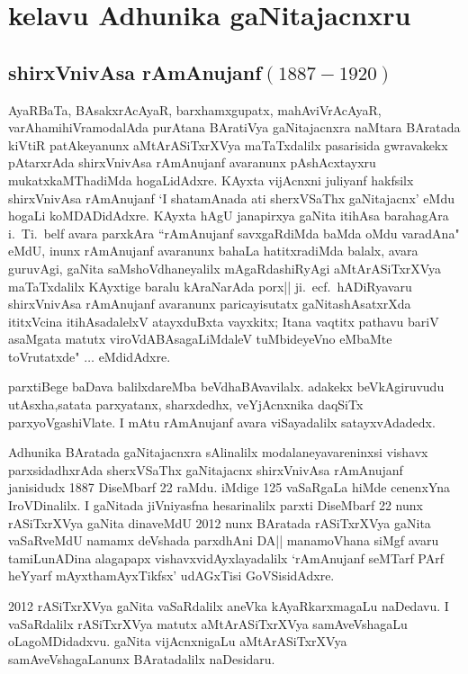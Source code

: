 \chapter{kelavu Adhunika gaNitajacnxru}

\section{{\protect\bf shirxVnivAsa rAmAnujanf$(1887-1920)$}}


AyaRBaTa, BAsakxrAcAyaR, barxhamxgupatx, mahAviVrAcAyaR, varAhamihiVra\break modalAda purAtana BAratiVya gaNitajacnxra naMtara BAratada kiVtiR patAkeyanunx aMtArASiTxrXVya maTaTxdalilx pasarisida gwravakekx pAtarxrAda shirxVnivAsa rAmAnujanf avaranunx pAshAcxtayxru mukatxkaMThadiMda hogaLidAdxre. KAyxta vijAcnxni juliyanf hakfsilx shirxVnivAsa rAmAnujanf `I shatamAnada ati sherxVSaThx gaNitajacnx' eMdu hogaLi koMDADidAdxre. KAyxta hAgU janapirxya gaNita itihAsa barahagAra i.~Ti.~belf avara parxkAra ``rAmAnujanf savxgaRdiMda baMda oMdu varadAna" eMdU, inunx rAmAnujanf avaranunx bahaLa hatitxradiMda balalx, avara guruvAgi, gaNita saMshoVdhaneyalilx mAgaRdashiRyAgi aMtArASiTxrXVya maTaTxdalilx KAyxtige baralu kAraNarAda porx|| ji.~ecf.~hADiRyavaru shirxVnivAsa rAmAnujanf avaranunx paricayisutatx gaNitashAsatxrXda ititxVcina itihAsadalelxV atayxduBxta vayxkitx; Itana vaqtitx pathavu bariV asaMgata matutx viroVdABAsagaLiMdaleV tuMbideyeVno eMbaMte toVrutatxde" $\ldots$ eMdidAdxre.

parxtiBege baDava balilxdareMba beVdhaBAvavilalx. adakekx beVkAgiruvudu utAsxha,\break satata parxyatanx, sharxdedhx, veYjAcnxnika daqSiTx parxyoVgashiVlate. I mAtu rAmAnujanf avara viSayadalilx satayxvAdadedx.

Adhunika BAratada gaNitajacnxra sAlinalilx modalaneyavareninxsi vishavx parxsidadhxrAda sherxVSaThx gaNitajacnx shirxVnivAsa rAmAnujanf janisidudx {\rm 1887} DiseMbarf {\rm 22} raMdu. iMdige {\rm 125} vaSaRgaLa hiMde cenenxYna IroVDinalilx. I gaNitada jiVniyasfna hesarinalilx parxti DiseM\-barf {\rm 22} nunx rASiTxrXVya gaNita dinaveMdU {\rm 2012} nunx BAratada rASiTxrXVya gaNita vaSaRveMdU namamx deVshada parxdhAni DA|| manamoVhana siMgf avaru tamiLunADina alagapapx vishavxvidAyxlayadalilx `rAmAnujanf seMTarf PArf heYyarf mAyxthamAyxTikfsx' udAGxTisi GoVSisidAdxre.

{\rm 2012} rASiTxrXVya gaNita vaSaRdalilx aneVka kAyaRkarxmagaLu naDedavu. I vaSaRdalilx rASiTxrXVya matutx aMtArASiTxrXVya samAveVshagaLu oLagoMDidadxvu. gaNita vijAcnxnigaLu aMtArASiTxrXVya samAveVshagaLanunx BAratadalilx naDesidaru.

